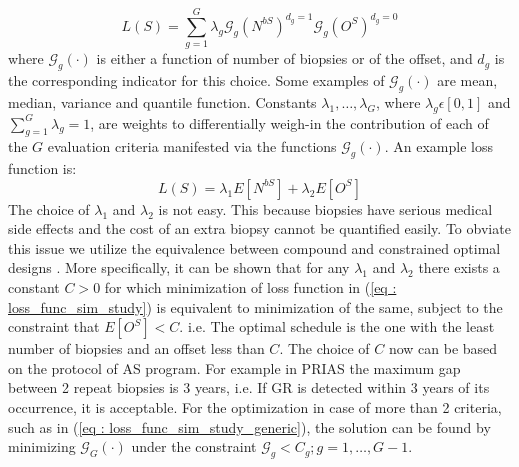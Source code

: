 \begin{equation}
\label{eq : loss_func_sim_study_generic}
L(S) = \sum_{g=1}^G \lambda_g \mathcal{G}_g(N^{bS})^{d_g=1}\mathcal{G}_g(O^S)^{d_g=0}
\end{equation}
where $\mathcal{G}_g(\cdot)$ is either a function of number of biopsies or of the offset, and $d_g$ is the corresponding indicator for this choice. Some examples of $\mathcal{G}_g(\cdot)$ are mean, median, variance and quantile function. Constants $\lambda_1, \ldots, \lambda_G$, where $\lambda_g \epsilon [0,1]$ and $\sum_{g=1}^G \lambda_g = 1$, are weights to differentially weigh-in the contribution of each of the $G$ evaluation criteria manifested via the functions $\mathcal{G}_g(\cdot)$. An example loss function is:
\begin{equation}
\label{eq : loss_func_sim_study}
L(S) = \lambda_1 E[N^{bS}] + \lambda_2 E[O^S] 
\end{equation}
The choice of $\lambda_1$ and $\lambda_2$ is not easy. This because biopsies have serious medical side effects and the cost of an extra biopsy cannot be quantified easily. To obviate this issue we utilize the equivalence between compound and constrained optimal designs \citep{cook1994equivalence}. More specifically, it can be shown that for any $\lambda_1$ and $\lambda_2$ there exists a constant $C>0$ for which minimization of loss function in (\ref{eq : loss_func_sim_study}) is equivalent to minimization of the same, subject to the constraint that $E[O^S] < C$. i.e. The optimal schedule is the one with the least number of biopsies and an offset less than $C$. The choice of $C$ now can be based on the protocol of AS program. For example in PRIAS the maximum gap between 2 repeat biopsies is 3 years, i.e. If GR is detected within 3 years of its occurrence, it is acceptable. For the optimization in case of more than 2 criteria, such as in (\ref{eq : loss_func_sim_study_generic}), the solution can be found by minimizing $\mathcal{G}_G(\cdot)$ under the constraint $\mathcal{G}_g < C_g; g=1, \ldots, G-1$.\\

